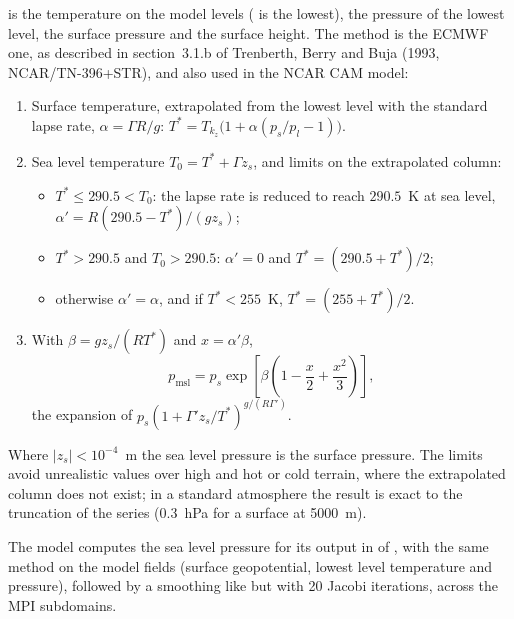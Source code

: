  is the temperature on the model levels ( is the lowest),
 the pressure of the lowest level,  the surface pressure
and  the surface height. The method is the ECMWF one, as described
in section~3.1.b of Trenberth, Berry and Buja (1993, NCAR/TN-396+STR), and
also used in the NCAR CAM model:

\begin{enumerate}
  \item Surface temperature, extrapolated from the lowest level with the
        standard lapse rate, $\alpha = \Gamma R/g$:
        $T^* = T_{k_z}\bigl(1 + \alpha(p_s/p_l - 1)\bigr)$.
  \item Sea level temperature $T_0 = T^* + \Gamma z_s$, and limits on the
        extrapolated column:
        \begin{itemize}
          \item $T^* \le 290.5 < T_0$: the lapse rate is reduced to reach
                $290.5$~K at sea level, $\alpha' = R(290.5 - T^*)/(g z_s)$;
          \item $T^* > 290.5$ and $T_0 > 290.5$: $\alpha' = 0$ and
                $T^* = (290.5 + T^*)/2$;
          \item otherwise $\alpha' = \alpha$, and if $T^* < 255$~K,
                $T^* = (255 + T^*)/2$.
        \end{itemize}
  \item With $\beta = g z_s/(R T^*)$ and $x = \alpha'\beta$,
        \[
          p_\text{msl} = p_s\exp\!\left[\beta\left(1 - \frac{x}{2} +
                         \frac{x^2}{3}\right)\right],
        \]
        the expansion of $p_s(1 + \Gamma' z_s/T^*)^{g/(R\Gamma')}$.
\end{enumerate}

\noindent Where $|z_s| < 10^{-4}$~m the sea level pressure is the surface
pressure. The limits avoid unrealistic values over high and hot or cold
terrain, where the extrapolated column does not exist; in a standard
atmosphere the result is exact to the truncation of the series (0.3~hPa for
a surface at 5000~m).

The model computes the sea level pressure for its output in
 of , with the same method on the model
fields (surface geopotential, lowest level temperature and pressure),
followed by a smoothing like  but with 20 Jacobi
iterations, across the MPI subdomains.

